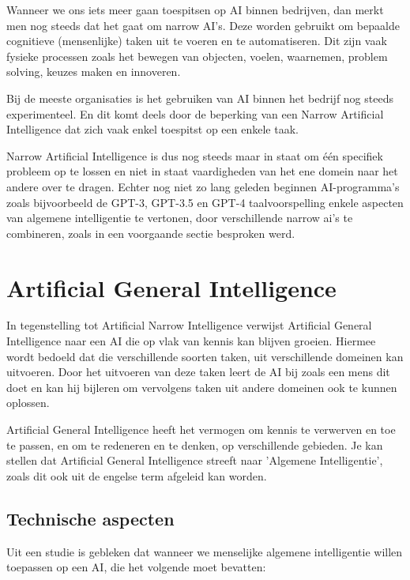 Wanneer we ons iets meer gaan toespitsen op AI binnen bedrijven, dan merkt men nog steeds dat het gaat om narrow AI’s. Deze worden gebruikt om bepaalde cognitieve (mensenlijke) taken uit te voeren en te automatiseren. Dit zijn vaak fysieke processen zoals het bewegen van objecten, voelen, waarnemen, problem solving, keuzes maken en innoveren. 

Bij de meeste organisaties is het gebruiken van AI binnen het bedrijf nog steeds experimenteel. En dit komt deels door de beperking van een Narrow Artificial Intelligence dat zich vaak enkel toespitst op een enkele taak.

Narrow Artificial Intelligence is dus nog steeds maar in staat om één specifiek probleem op te lossen en niet in staat vaardigheden van het ene domein naar het andere over te dragen. Echter nog niet zo lang geleden beginnen AI-programma’s zoals bijvoorbeeld de GPT-3, GPT-3.5 en GPT-4 taalvoorspelling enkele aspecten van algemene intelligentie te vertonen, door verschillende narrow ai's te combineren, zoals in een voorgaande sectie besproken werd.

\autocite{benbya2020artificial}

\section{Artificial General Intelligence}

In tegenstelling tot Artificial Narrow Intelligence verwijst Artificial General Intelligence naar een AI die op vlak van kennis kan blijven groeien. Hiermee wordt bedoeld dat die verschillende soorten taken, uit verschillende domeinen kan uitvoeren. Door het uitvoeren van deze taken leert de AI bij zoals een mens dit doet en kan hij bijleren om vervolgens taken uit andere domeinen ook te kunnen oplossen. 

Artificial General Intelligence heeft het vermogen om kennis te verwerven en toe te passen, en om te redeneren en te denken, op verschillende gebieden. Je kan stellen dat Artificial General Intelligence streeft naar 'Algemene Intelligentie', zoals dit ook uit de engelse term afgeleid kan worden. 

\subsection{Technische aspecten}

Uit een studie is gebleken dat wanneer we menselijke algemene intelligentie willen toepassen op een AI, die het volgende moet bevatten: \linebreak

